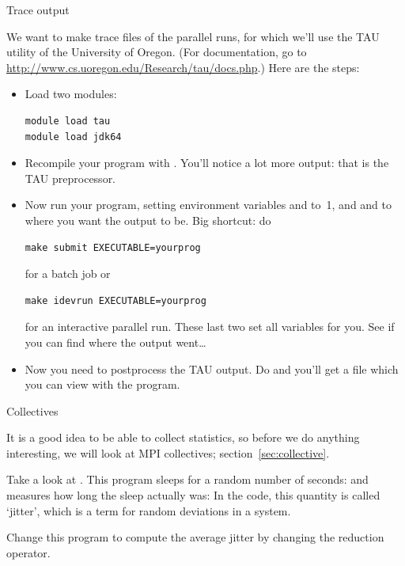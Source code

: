 \begin{istc}
   {Trace output}

  We want to make trace files of the parallel runs, for which we'll
  use the TAU utility of the University of Oregon. 
  (For documentation, go to \url{http://www.cs.uoregon.edu/Research/tau/docs.php}.)
  Here are the steps:
  \begin{itemize}
  \item Load two modules:
\begin{verbatim}
module load tau
module load jdk64
\end{verbatim}
  \item Recompile your program with . You'll notice a
    lot more output: that is the TAU preprocessor.
  \item Now run your program, setting environment variables
     and  to~1, and  and
     to where you want the output to be.  Big shortcut:
    do 
\begin{verbatim}
make submit EXECUTABLE=yourprog
\end{verbatim}
    for a batch job or 
\begin{verbatim}
make idevrun EXECUTABLE=yourprog
\end{verbatim}
    for an interactive parallel
    run. These last two set all variables for you. See if you can find
    where the output went\ldots
  \item Now you need to postprocess the TAU output. Do  and you'll get a file
     which you can view with the 
    program.
  \end{itemize}
\end{istc}

 {Collectives}

It is a good idea to be able to collect statistics, so before we do
anything interesting, we will look at MPI collectives;
section~\ref{sec:collective}.

Take a look at . This program sleeps for a random
number of seconds: 
and measures how long the sleep actually was:
In the code, this quantity is called `jitter', which is a term
for random deviations in a system.

\begin{exercise}
  Change this program to compute the average jitter by changing the reduction
  operator.
\end{exercise}

